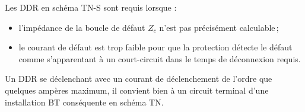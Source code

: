 Les DDR en schéma TN-S sont requis lorsque :
\begin{itemize}
\item l'impédance de la boucle de défaut $Z_c$ n'est pas précisément calculable\,;
\item le courant de défaut est trop faible pour que la protection détecte le défaut comme s'apparentant à un court-circuit dans le temps de déconnexion requis.
\end{itemize}

Un DDR se déclenchant avec un courant de déclenchement de l'ordre que quelques ampères maximum, il convient bien à un circuit terminal d'une installation BT conséquente en schéma TN.





%
